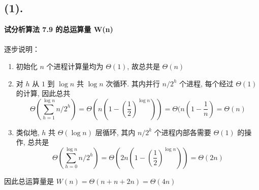 \documentclass[UTF8]{article}
\newcommand{\jumpLine} {\hspace*{\fill} \\}
\begin{document}
\subsection*{(1).}
\noindent \textbf{试分析算法 7.9 的总运算量 W(n)} \\ \jumpLine\noindent
逐步说明：
\begin{enumerate}[(1). ]
	\item 初始化 $n$ 个进程计算量均为 $\Theta(1)$, 故总共是 $\Theta(n)$
	\item 对 $h$ 从 $1$ 到 $\log n$ 共 $\log n$ 次循环. 其内并行 $n/2^h$ 个进程, 每个经过 $\Theta(1)$ 的计算, 因此总共 $$\Theta(\sum\limits_{h=1}^{\log n} n/2^h)=\Theta(n(1-(\frac{1}{2})^{\log n}))=\Theta(n(1-\frac{1}{n})=\Theta(n)$$
	\item 类似地, $h$ 共 $\Theta(\log n)$ 层循环, 其内 $n/2^k$ 个进程内部各需要 $\Theta(1)$ 的操作, 总共是 $$\Theta(\sum\limits_{h=0}^{\log n} n/2^h)=\Theta(2n(1-(\frac{1}{2})^{\log n}))=\Theta(2n)$$
\end{enumerate}

因此总运算量是 $W(n)=\Theta(n+n + 2n)=\Theta(4n)$
\end{document}
